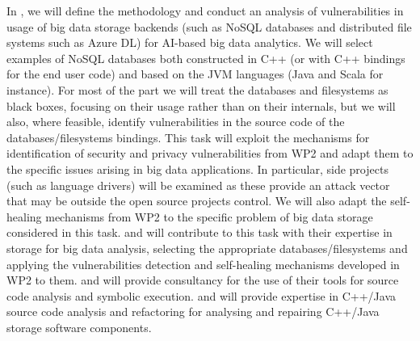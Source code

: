 \begin{Workpackage}{\thewpno}
\begin{Task}
\TaskResults{%
\ref{del:bigdata1},
\ref{del:bigdata2},
\ref{del:bigdata3}
}
\TaskHeader{}
In \theTask, we will define the methodology and conduct an analysis of vulnerabilities in usage of big data storage backends (such as NoSQL databases and distributed file systems such as Azure DL) for AI-based big data analytics.  We will select examples of NoSQL databases both constructed in C++ (or with C++ bindings for the end user code) and based on the JVM languages (Java and Scala for instance). For most of the part we will treat the databases and filesystems as black boxes, focusing on their usage rather than on their internals, but we will also, where feasible, identify vulnerabilities in the source code of the databases/filesystems bindings. This task will exploit the mechanisms for identification of security and privacy vulnerabilities from WP2 and adapt them to the specific issues arising in big data applications. In particular, side projects (such as language drivers) will be examined as these provide an attack vector that may be outside the open source projects control. We will also adapt the self-healing mechanisms from WP2 to the specific problem of big data storage considered in this task. 
\UODshort{} and \SOPRAshort{} will contribute to this task with their expertise in storage for big data analysis, selecting the appropriate databases/filesystems and applying the vulnerabilities detection and self-healing mechanisms developed in WP2 to them. 
\IBMshort{} and \YAGshort{} will provide consultancy for the use of their tools for source code analysis and symbolic execution. 
\UCMshort{} and \USTANshort{} will provide expertise in C++/Java source code analysis and refactoring for analysing and repairing C++/Java storage software components.
 \end{Task}


\end{Workpackage}
